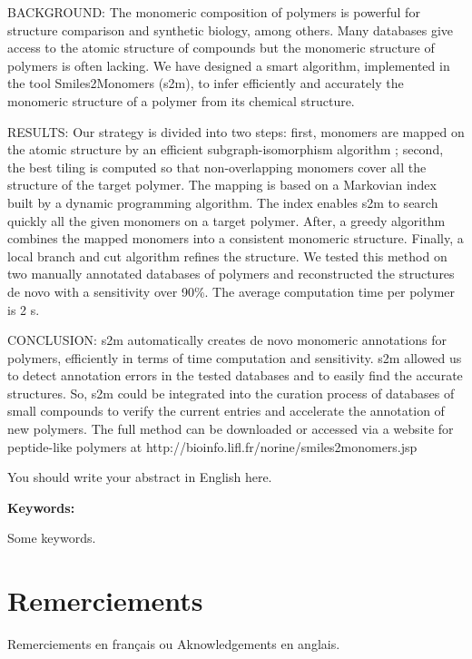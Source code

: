 \documentclass[12pt]{LHSV_thesis}
\begin{document}
BACKGROUND: The monomeric composition of polymers is powerful for structure comparison and synthetic biology, among others.
Many databases give access to the atomic structure of compounds but the monomeric structure of polymers is often lacking.
We have designed a smart algorithm, implemented in the tool Smiles2Monomers (s2m), to infer efficiently and accurately the monomeric structure of a polymer from its chemical structure.

RESULTS: Our strategy is divided into two steps: first, monomers are mapped on the atomic structure by an efficient subgraph-isomorphism algorithm ; second, the best tiling is computed so that non-overlapping monomers cover all the structure of the target polymer.
The mapping is based on a Markovian index built by a dynamic programming algorithm.
The index enables s2m to search quickly all the given monomers on a target polymer.
After, a greedy algorithm combines the mapped monomers into a consistent monomeric structure.
Finally, a local branch and cut algorithm refines the structure.
We tested this method on two manually annotated databases of polymers and reconstructed the structures de novo with a sensitivity over 90\%.
The average computation time per polymer is 2 s.

CONCLUSION: s2m automatically creates de novo monomeric annotations for polymers, efficiently in terms of time computation and sensitivity.
s2m allowed us to detect annotation errors in the tested databases and to easily find the accurate structures.
So, s2m could be integrated into the curation process of databases of small compounds to verify the current entries and accelerate the annotation of new polymers.
The full method can be downloaded or accessed via a website for peptide-like polymers at http://bioinfo.lifl.fr/norine/smiles2monomers.jsp

You should write your abstract in English here.
\vspace*{28pt}\par
\textbf{Keywords:}\par
Some keywords.
\par
\cleardoublepage

\section*{\Huge Remerciements}
%
\vspace{2cm}

Remerciements en français ou  Aknowledgements en anglais.
\end{document}
